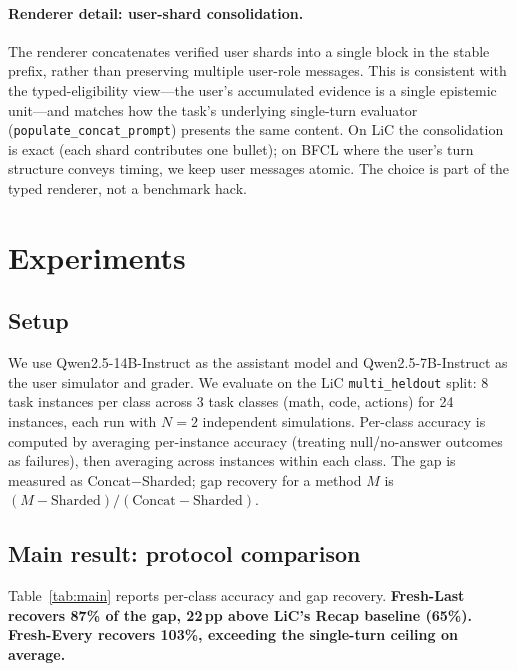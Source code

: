 \documentclass{article}
\begin{document}
\paragraph{Renderer detail: user-shard consolidation.}
The renderer concatenates verified user shards into a single block in the stable prefix, rather than preserving multiple user-role messages. This is consistent with the typed-eligibility view---the user's accumulated evidence is a single epistemic unit---and matches how the task's underlying single-turn evaluator (\texttt{populate\_concat\_prompt}) presents the same content. On LiC the consolidation is exact (each shard contributes one bullet); on BFCL where the user's turn structure conveys timing, we keep user messages atomic. The choice is part of the typed renderer, not a benchmark hack.

\section{Experiments}
\label{sec:experiments}

\subsection{Setup}
We use Qwen2.5-14B-Instruct as the assistant model and Qwen2.5-7B-Instruct as the user simulator and grader. We evaluate on the LiC \texttt{multi\_heldout} split: 8 task instances per class across 3 task classes (math, code, actions) for 24 instances, each run with $N=2$ independent simulations. Per-class accuracy is computed by averaging per-instance accuracy (treating null/no-answer outcomes as failures), then averaging across instances within each class. The gap is measured as Concat$-$Sharded; gap recovery for a method $M$ is $(M - \text{Sharded}) / (\text{Concat} - \text{Sharded})$.

\subsection{Main result: protocol comparison}
\label{sec:main-protocol}

Table~\ref{tab:main} reports per-class accuracy and gap recovery. \textbf{Fresh-Last recovers 87\% of the gap, 22\,pp above LiC's Recap baseline (65\%). Fresh-Every recovers 103\%, exceeding the single-turn ceiling on average.}
\end{document}
